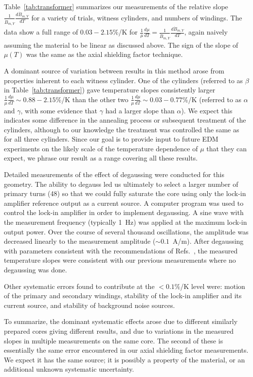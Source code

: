 Table~\ref{tab:transformer} summarizes our measurements of the
relative slope $\frac{1}{\dot{B}_{m,Y}}\frac{d\dot{B}_{m,Y}}{dT}$ for
a variety of trials, witness cylinders, and numbers of windings.  The
data show a full range of $0.03-2.15$\%/K for
$\frac{1}{\mu}\frac{d\mu}{dT}=\frac{1}{\dot{B}_{m,Y}}\frac{d\dot{B}_{m,Y}}{dT}$,
again naively assuming the material to be linear as discussed above.
The sign of the slope of $\mu(T)$ was the same as the axial shielding
factor technique.

A dominant source of variation between results in this method arose
from properties inherent to each witness cylinder.  One of the
cylinders (referred to as $\beta$ in Table~\ref{tab:transformer}) gave
temperature slopes consistently larger
$\frac{1}{\mu}\frac{d\mu}{dT}\sim 0.88-2.15$\%/K than the other two
$\frac{1}{\mu}\frac{d\mu}{dT}\sim 0.03-0.77$\%/K (referred to as
$\alpha$ and $\gamma$, with some evidence that $\gamma$ had a larger
slope than $\alpha$).  We expect this indicates some difference in the
annealing process or subsequent treatment of the cylinders, although
to our knowledge the treatment was controlled the same as for all
three cylinders.  Since our goal is to provide input to future EDM
experiments on the likely scale of the temperature dependence of $\mu$
that they can expect, we phrase our result as a range covering all
these results.

Detailed measurements of the effect of degaussing were conducted for
this geometry.  The ability to degauss led us ultimately to select a
larger number of primary turns (48) so that we could fully saturate
the core using only the lock-in amplifier reference output as a
current source.  A computer program was used to control the lock-in
amplifier in order to implement degaussing.  A sine wave with the
measurement frequency (typically 1~Hz) was applied at the maximum
lock-in output power.  Over the course of several thousand
oscillations, the amplitude was decreased linearly to the measurement
amplitude ($\sim 0.1$~A/m).  After degaussing with parameters
consistent with the recommendations of
Refs.~\cite{thiel2007demagnetization,altarev2015minimizing}, the measured temperature
slopes were consistent with our previous measurements where no
degaussing was done.

Other systematic errors found to contribute at the $<0.1\%$/K level
were: motion of the primary and secondary windings, stability of the
lock-in amplifier and its current source, and stability of background
noise sources.

To summarize, the dominant systematic effects arose due to different
similarly prepared cores giving different results, and due to
variations in the measured slopes in multiple measurements on the same
core.  The second of these is essentially the same error encountered
in our axial shielding factor measurements.  We expect it has the same
source; it is possibly a property of the material, or an additional
unknown systematic uncertainty.
